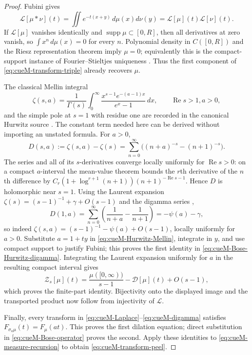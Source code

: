 \begin{proof}
Fubini gives
\[
 \mathcal L[\mu*\nu](t)=\iint e^{-t(x+y)}\,d\mu(x)d\nu(y)
 =\mathcal L[\mu](t)\mathcal L[\nu](t).
\]
If $\mathcal L[\mu]$ vanishes identically and $\operatorname{supp}\mu\subset[0,R]$, then
all derivatives at zero vanish, so $\int x^n\,d\mu(x)=0$ for every $n$.  Polynomial density
in $C([0,R])$ and the Riesz representation theorem imply $\mu=0$; equivalently this is the
compact-support instance of Fourier--Stieltjes uniqueness
\cite{rudin1990}.  Thus the first component of \eqref{eq:cueM-transform-triple} already
recovers $\mu$.

 The classical Mellin integral
\begin{equation}
 \zeta(s,a)=\frac1{\Gamma(s)}\int_0^\infty
 \frac{x^{s-1}e^{-(a-1)x}}{e^x-1}\,dx,
 \qquad \operatorname{Re}s>1, a>0,
 \label{eq:cueM-Hurwitz-Mellin}
\end{equation}
 and the simple pole at $s=1$ with residue one are recorded in the canonical Hurwitz source
 \cite[\S25.11(i),(vii)]{apostolDLMF25}.  The constant term needed here can be derived
 without importing an unstated formula.  For $a>0$,
 \[
  D(s,a):=\zeta(s,a)-\zeta(s)
  =\sum_{n=0}^{\infty}\bigl((n+a)^{-s}-(n+1)^{-s}\bigr).
 \]
 The series and all of its $s$-derivatives converge locally uniformly for
 $\operatorname{Re}s>0$: on a compact $a$-interval the mean-value theorem bounds the
 $r$th derivative of the $n$th difference by
 $C_r(1+\log^{r+1}(n+1))(n+1)^{-\operatorname{Re}s-1}$.  Hence $D$ is holomorphic near
 $s=1$.  Using the Laurent expansion
 $\zeta(s)=(s-1)^{-1}+\gamma+O(s-1)$ and the digamma series
 \cite[eq.~(5.7.6)]{askeyRoyDLMF5},
 \[
  D(1,a)=\sum_{n=0}^{\infty}\left(\frac1{n+a}-\frac1{n+1}\right)
        =-\psi(a)-\gamma,
 \]
 so indeed $\zeta(s,a)=(s-1)^{-1}-\psi(a)+O(s-1)$, locally uniformly for $a>0$.
 Substitute $a=1+ty$ in
\eqref{eq:cueM-Hurwitz-Mellin}, integrate in $y$, and use compact support to justify Fubini;
this proves the first identity in \eqref{eq:cueM-Bose-Hurwitz-digamma}.  Integrating the
Laurent expansion uniformly for $a$ in the resulting compact interval gives
\[
 \mathcal Z_s[\mu](t)=\frac{\mu([0,\infty))}{s-1}
 -\mathcal D[\mu](t)+O(s-1),
\]
which proves the finite-part identity.  Bijectivity onto the displayed image and the
transported product now follow from injectivity of $\mathcal L$.

Finally, every transform in \eqref{eq:cueM-Laplace}--\eqref{eq:cueM-digamma} satisfies
$F_{\sigma_a\mu}(t)=F_\mu(at)$.  This proves the first dilation equation; direct substitution
in \eqref{eq:cueM-Bose-operator} proves the second.  Apply these identities to
\eqref{eq:cueM-measure-recursion} to obtain \eqref{eq:cueM-transform-peel}.
\end{proof}

